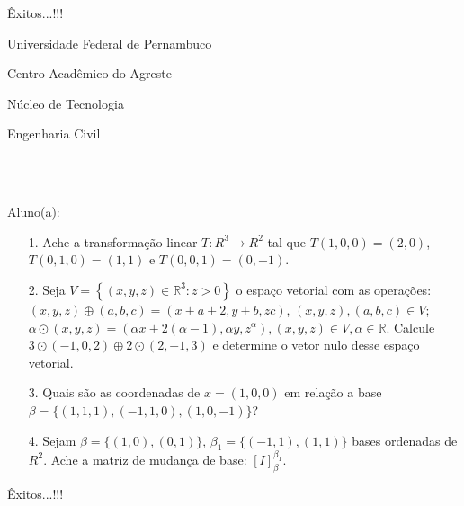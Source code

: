 \documentclass[oneside,a4paper,12pt]{article}
\newcommand{\universidade}{Universidade Federal de Pernambuco}
\newcommand{\centro}{Centro Acadêmico do Agreste}
\newcommand{\departamento}{Núcleo de Tecnologia}
\newcommand{\curso}{Engenharia Civil}
\begin{document}
	\flushbottom
	\flushright
     Êxitos...!!!
  \vspace{12pt}
  
     \begin{center}
     	\vspace{0pt}
     	
     	\universidade
     	\par
     	\centro
     	\par
     	\departamento
     	\par
     	\curso
     	\par
     	\vspace{08pt}
     	\\ \\
     \end{center}
     
     \begin{flushleft}
     	Aluno(a):
     \end{flushleft}
 
 \begin{itemize}
 	\item[1.] Ache a transformação linear $T:R^{3}\longrightarrow R^{2}$ tal que $T(1,0,0)=(2,0)$, $T(0,1,0)=(1,1)$ e $T(0,0,1)=(0,-1)$.
 \end{itemize}
 \begin{itemize}
 	\item[2.] Seja $V=\left\lbrace (x,y,z)\in \mathbb{R}^{3}: z>0 \right\rbrace $ o espaço vetorial com as operações:
 	$(x,y,z)\oplus(a,b,c)=(x+a+2,y+b,zc)$, $(x,y,z), (a,b,c)\in V$;
 	$\alpha\odot(x,y,z)=(\alpha x+2(\alpha-1), \alpha y, z^{\alpha}), (x,y,z)\in V, \alpha \in \mathbb{R}$.
    Calcule $3\odot(-1,0,2)\oplus 2\odot(2,-1,3)$ e determine o vetor nulo desse espaço vetorial.
 \end{itemize}
 \begin{itemize}
 	\item [3.] Quais são as coordenadas de $x=(1,0,0)$ em relação a base $\beta=\{(1,1,1), (-1,1,0),(1,0,-1)\}$?
 \end{itemize}
 \begin{itemize}
 	\item[4.] Sejam $\beta=\{(1,0),(0,1)\}$, $\beta_{1}=\{(-1,1), (1,1)\}$ bases ordenadas de $R^{2}$. Ache a matriz de mudança de base: $[I]_{\beta}^{\beta_{1}}$.
 	
 \end{itemize}
\flushbottom
\flushright
Êxitos...!!!
\end{document}
